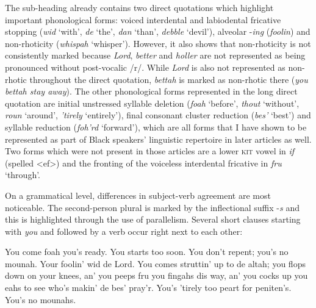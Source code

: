 The sub-heading already contains two direct quotations which highlight important phonological forms: voiced interdental and labiodental fricative stopping (\emph{wid} ‘with’, \emph{de} ‘the’, \emph{dan} ‘than’, \emph{debble} ‘devil’), alveolar -\emph{ing} (\emph{foolin}) and non-rhoticity (\emph{whispah} ‘whisper’). However, it also shows that non-rhoticity is not consistently marked because \emph{Lord}, \emph{better} and \emph{holler} are not represented as being pronounced without post-vocalic /r/. While \emph{Lord} is also not represented as non-rhotic throughout the direct quotation, \emph{bettah} is marked as non-rhotic there (\emph{you bettah stay away}). The other phonological forms represented in the long direct quotation are initial unstressed syllable deletion (\emph{foah} ‘before’, \emph{thout} ‘without’, \emph{roun} ‘around’, \emph{’tirely} ‘entirely’), final consonant cluster reduction (\emph{bes’} ‘best’) and syllable reduction (\emph{foh’rd} ‘forward’), which are all forms that I have shown to be represented as part of Black speakers’ linguistic repertoire in later articles as well. Two forms which were not present in those articles are a lower \textsc{kit} vowel in \emph{if} (spelled <ef>) and the fronting of the voiceless interdental fricative in \emph{fru} ‘through’.

On a grammatical level, differences in subject-verb agreement are most noticeable. The second-person plural is marked by the inflectional suffix -\emph{s} and this is highlighted through the use of parallelism. Several short clauses starting with \emph{you} and followed by a verb occur right next to each other:

\begin{ipquote}
You come foah you’s ready. You starts too soon. You don’t repent; you’s no mounah. Your foolin’ wid de Lord. You comes struttin’ up to de altah; you flops down on your knees, an’ you peeps fru you fingahs dis way, an’ you cocks up you eahs to see who’s makin’ de bes’ pray’r. You’s ’tirely too peart for peniten’s. You’s no mounahs.
\end{ipquote}


